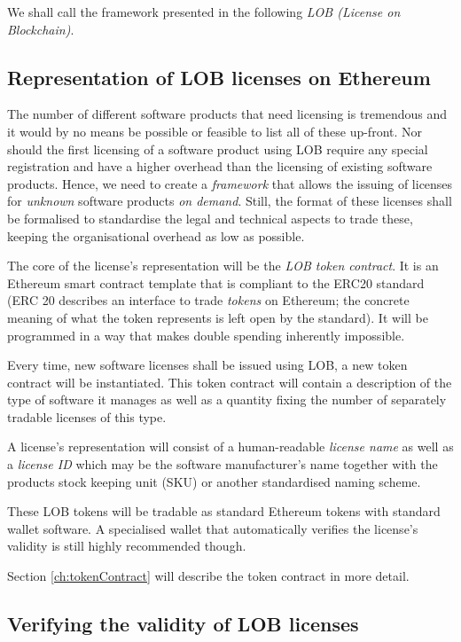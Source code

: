 \documentclass[a4paper]{article}
\begin{document}
We shall call the framework presented in the following \emph{LOB (License on Blockchain)}.


\subsection{Representation of LOB licenses on Ethereum}

The number of different software products that need licensing is tremendous and it would by no means be possible or feasible to list all of these up-front. Nor should the first licensing of a software product using LOB require any special registration and have a higher overhead than the licensing of existing software products. Hence, we need to create a \emph{framework} that allows the issuing of licenses for \emph{unknown} software products \emph{on demand}. Still, the format of these licenses shall be formalised to standardise the legal and technical aspects to trade these, keeping the organisational overhead as low as possible.

The core of the license's representation will be the \emph{LOB token contract}. It is an Ethereum smart contract template that is compliant to the ERC20 \cite{erc20} standard (ERC 20 describes an interface to trade \emph{tokens} on Ethereum; the concrete meaning of what the token represents is left open by the standard). It will be programmed in a way that makes double spending inherently impossible.

Every time, new software licenses shall be issued using LOB, a new token contract will be instantiated. This token contract will contain a description of the type of software it manages as well as a quantity fixing the number of separately tradable licenses of this type.
 
A license's representation will consist of a human-readable \emph{license name} as well as a \emph{license ID} which may be the software manufacturer's name together with the products stock keeping unit (SKU) or another standardised naming scheme.

These LOB tokens will be tradable as standard Ethereum tokens with standard wallet software. A specialised wallet that automatically verifies the license's validity is still highly recommended though.

Section \ref{ch:tokenContract} will describe the token contract in more detail.

\subsection{Verifying the validity of LOB licenses}
\end{document}
